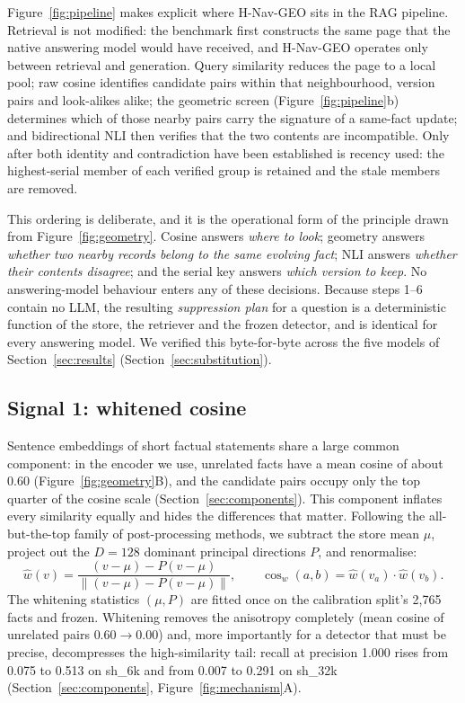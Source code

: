 \documentclass[journal=jcisd8,manuscript=article]{achemso}
\begin{document}
Figure~\ref{fig:pipeline} makes explicit where H-Nav-GEO sits in the RAG pipeline. Retrieval is not modified: the benchmark first constructs the same page that the native answering model would have received, and H-Nav-GEO operates only between retrieval and generation. Query similarity reduces the page to a local pool; raw cosine identifies candidate pairs within that neighbourhood, version pairs and look-alikes alike; the geometric screen (Figure~\ref{fig:pipeline}b) determines which of those nearby pairs carry the signature of a same-fact update; and bidirectional NLI then verifies that the two contents are incompatible. Only after both identity and contradiction have been established is recency used: the highest-serial member of each verified group is retained and the stale members are removed.

This ordering is deliberate, and it is the operational form of the principle drawn from Figure~\ref{fig:geometry}. Cosine answers \emph{where to look}; geometry answers \emph{whether two nearby records belong to the same evolving fact}; NLI answers \emph{whether their contents disagree}; and the serial key answers \emph{which version to keep}. No answering-model behaviour enters any of these decisions. Because steps 1--6 contain no LLM, the resulting \emph{suppression plan} for a question is a deterministic function of the store, the retriever and the frozen detector, and is identical for every answering model. We verified this byte-for-byte across the five models of Section~\ref{sec:results} (Section~\ref{sec:substitution}).

\subsection{Signal 1: whitened cosine}
\label{sec:white}

Sentence embeddings of short factual statements share a large common component: in the encoder we use, unrelated facts have a mean cosine of about 0.60 (Figure~\ref{fig:geometry}B), and the candidate pairs occupy only the top quarter of the cosine scale (Section~\ref{sec:components}). This component inflates every similarity equally and hides the differences that matter. Following the all-but-the-top family of post-processing methods, we subtract the store mean $\mu$, project out the $D=128$ dominant principal directions $P$, and renormalise:
\begin{equation}
\hat w(v)=\frac{(v-\mu)-P(v-\mu)}{\lVert(v-\mu)-P(v-\mu)\rVert},\qquad
\operatorname{cos}_w(a,b)=\hat w(v_a)\cdot\hat w(v_b).
\end{equation}
The whitening statistics $(\mu,P)$ are fitted once on the calibration split's 2,765 facts and frozen. Whitening removes the anisotropy completely (mean cosine of unrelated pairs $0.60\to0.00$) and, more importantly for a detector that must be precise, decompresses the high-similarity tail: recall at precision 1.000 rises from 0.075 to 0.513 on sh\_6k and from 0.007 to 0.291 on sh\_32k (Section~\ref{sec:components}, Figure~\ref{fig:mechanism}A).
\end{document}
